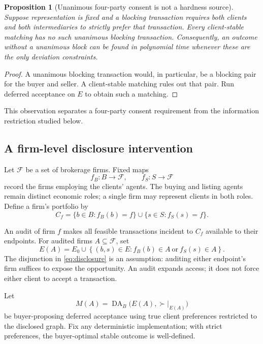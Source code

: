 \documentclass[11pt,letterpaper]{article}
\newtheorem{proposition}[theorem]{Proposition}
\theoremstyle{definition}
\theoremstyle{remark}
\newcommand{\DA}{\operatorname{DA}_{B}}
\newcommand{\Feas}{\mathcal{F}}
\begin{document}
\begin{proposition}[Unanimous four-party consent is not a hardness source]
Suppose representation is fixed and a blocking transaction requires both
clients and both intermediaries to strictly prefer that transaction.
Every client-stable matching has no such unanimous blocking transaction.
Consequently, an outcome without a unanimous block can be found in polynomial
time whenever these are the only deviation constraints.
\end{proposition}

\begin{proof}
A unanimous blocking transaction would, in particular, be a blocking pair for
the buyer and seller. A client-stable matching rules out that pair.
Run deferred acceptance on \(E\) to obtain such a matching.
\end{proof}

This observation separates a four-party consent requirement from the
information restriction studied below.

\subsection{A firm-level disclosure intervention}

Let \(\Feas\) be a set of brokerage firms. Fixed maps
\[
f_B:B\longrightarrow\Feas,
\qquad
f_S:S\longrightarrow\Feas
\]
record the firms employing the clients' agents. The buying and listing agents
remain distinct economic roles; a single firm may represent clients in both
roles. Define a firm's portfolio by
\[
C_f=\{b\in B:f_B(b)=f\}\cup\{s\in S:f_S(s)=f\}.
\]

An audit of firm \(f\) makes all feasible transactions incident to \(C_f\)
available to their endpoints. For audited firms \(A\subseteq\Feas\), set
\begin{equation}
E(A)=E_0\cup
\left\{(b,s)\in E:
f_B(b)\in A\ \text{or}\ f_S(s)\in A
\right\}.
\label{eq:disclosure}
\end{equation}
The disjunction in \eqref{eq:disclosure} is an assumption: auditing either
endpoint's firm suffices to expose the opportunity. An audit expands access; it
does not force either client to accept a transaction.

Let
\begin{equation}
M(A)=\DA\bigl(E(A),\succ|_{E(A)}\bigr)
\label{eq:response}
\end{equation}
be buyer-proposing deferred acceptance using true client preferences restricted
to the disclosed graph. Fix any deterministic implementation; with strict
preferences, the buyer-optimal stable outcome is well-defined.
\end{document}
